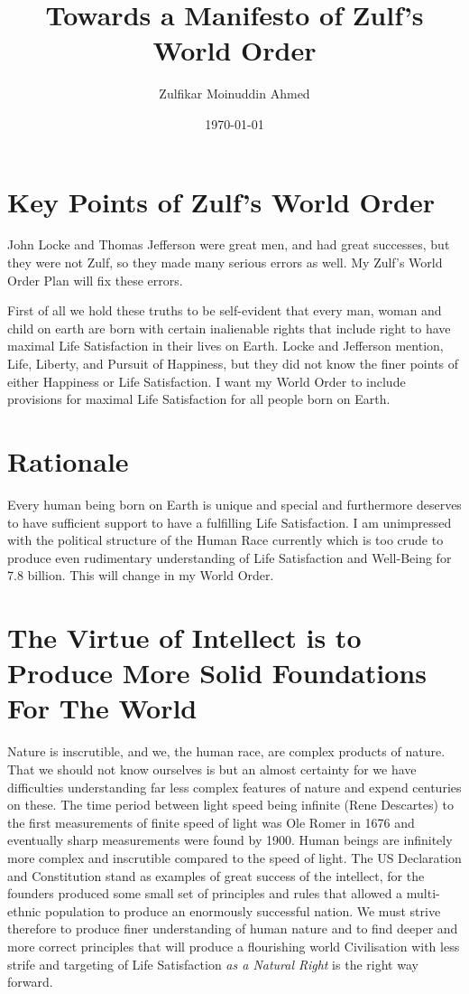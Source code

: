 \documentclass{amsart}
\title{Towards a Manifesto of Zulf's World Order}
\author{Zulfikar Moinuddin Ahmed}
\date{\today}
\begin{document}
\maketitle

\section{Key Points of Zulf's World Order}

John Locke and Thomas Jefferson were great men, and had great successes, but they were not Zulf, so they made many serious errors as well.  My Zulf's World Order Plan will fix these errors.

First of all we hold these truths to be self-evident that every man, woman and child on earth are born with certain inalienable rights that include right to have maximal Life Satisfaction in their lives on Earth.  Locke and Jefferson mention, Life, Liberty, and Pursuit of Happiness, but they did not know the finer points of either Happiness or Life Satisfaction.  I want my World Order to include provisions for maximal Life Satisfaction for all people born on Earth.

\section{Rationale}

Every human being born on Earth is unique and special and furthermore deserves to have sufficient support to have a fulfilling Life Satisfaction.  I am unimpressed with the political structure of the Human Race currently which is too crude to produce even rudimentary understanding of Life Satisfaction and Well-Being for 7.8 billion.  This will change in my World Order.

\section{The Virtue of Intellect is to Produce More Solid Foundations For The World}

Nature is inscrutible, and we, the human race, are complex products of nature.  That we should not know ourselves is but an almost certainty for we have difficulties understanding far less complex features of nature and expend centuries on these.  The time period between light speed being infinite (Rene Descartes) to the first measurements of finite speed of light was Ole Romer in 1676 and eventually sharp measurements were found by 1900.  Human beings are infinitely more complex and inscrutible compared to the speed of light.  The US Declaration and Constitution stand as examples of great success of the intellect, for the founders produced some small set of principles and rules that allowed a multi-ethnic population to produce an enormously successful nation.  We must strive therefore to produce finer understanding of human nature and to find deeper and more correct principles that will produce a flourishing world Civilisation with less strife and targeting of Life Satisfaction {\em as a Natural Right} is the right way forward.  
\end{document}

